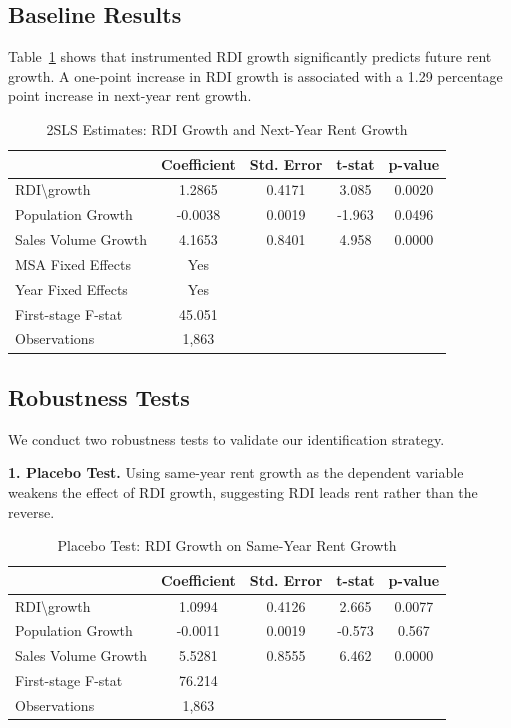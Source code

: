 \documentclass[APA,Times1COL]{WileyNJDv5} %
\begin{document}
\subsection{Baseline Results}
Table~\ref{tab:main-results} shows that instrumented RDI growth significantly predicts future rent growth. A one-point increase in RDI growth is associated with a 1.29 percentage point increase in next-year rent growth.

\begin{table}[h]
	\centering
	\caption{2SLS Estimates: RDI Growth and Next-Year Rent Growth}
	\label{tab:main-results}
	\begin{tabular}{lcccc} \toprule
		& Coefficient & Std. Error & t-stat & p-value \\ \midrule
		RDI\textbackslash growth & 1.2865 & 0.4171 & 3.085 & 0.0020 \\
		Population Growth & -0.0038 & 0.0019 & -1.963 & 0.0496 \\
		Sales Volume Growth & 4.1653 & 0.8401 & 4.958 & 0.0000 \\
		\midrule
		MSA Fixed Effects & Yes & & & \\
		Year Fixed Effects & Yes & & & \\
		First-stage F-stat & 45.051 & & &\\
		Observations & 1,863 & & & \\ \bottomrule
	\end{tabular}
\end{table}

\subsection{Robustness Tests}
We conduct two robustness tests to validate our identification strategy.

\textbf{1. Placebo Test.} Using same-year rent growth as the dependent variable weakens the effect of RDI growth, suggesting RDI leads rent rather than the reverse.

\begin{table}[h]
	\centering
	\caption{Placebo Test: RDI Growth on Same-Year Rent Growth}
	\label{tab:placebo}
	\begin{tabular}{lcccc} \toprule
		& Coefficient & Std. Error & t-stat & p-value \\ \midrule
		RDI\textbackslash growth & 1.0994 & 0.4126 & 2.665 & 0.0077 \\
		Population Growth & -0.0011 & 0.0019 & -0.573 & 0.567 \\
		Sales Volume Growth & 5.5281 & 0.8555 & 6.462 & 0.0000 \\
		\midrule
		First-stage F-stat & 76.214 & & & \\
		Observations & 1,863 & & & \\ \bottomrule
	\end{tabular}
\end{table}
\end{document}
